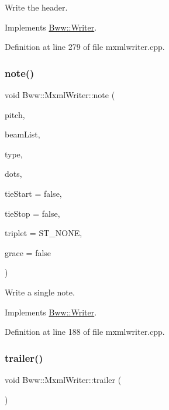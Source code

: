 Write the header. 

Implements \hyperlink{class_bww_1_1_writer}{Bww\+::\+Writer}.



Definition at line 279 of file mxmlwriter.\+cpp.

\mbox{\label{class_bww_1_1_mxml_writer_af0d0501ae75990d1272466ff82ce7d81}} 
\subsubsection{\texorpdfstring{note()}{note()}}
{\footnotesize\ttfamily void Bww\+::\+Mxml\+Writer\+::note (\begin{DoxyParamCaption}\item[{const Q\+String}]{pitch,  }\item[{const Q\+Vector$<$ Beam\+Type $>$}]{beam\+List,  }\item[{const Q\+String}]{type,  }\item[{const int}]{dots,  }\item[{bool}]{tie\+Start = {\ttfamily false},  }\item[{bool}]{tie\+Stop = {\ttfamily false},  }\item[{Start\+Stop}]{triplet = {\ttfamily ST\+\_\+NONE},  }\item[{bool}]{grace = {\ttfamily false} }\end{DoxyParamCaption})\hspace{0.3cm}{\ttfamily [virtual]}}

Write a single note. 

Implements \hyperlink{class_bww_1_1_writer}{Bww\+::\+Writer}.



Definition at line 188 of file mxmlwriter.\+cpp.

\mbox{\label{class_bww_1_1_mxml_writer_a2ad97b2e225efdf90482cf7615180746}} 
\subsubsection{\texorpdfstring{trailer()}{trailer()}}
{\footnotesize\ttfamily void Bww\+::\+Mxml\+Writer\+::trailer (\begin{DoxyParamCaption}{ }\end{DoxyParamCaption})\hspace{0.3cm}{\ttfamily [virtual]}}

